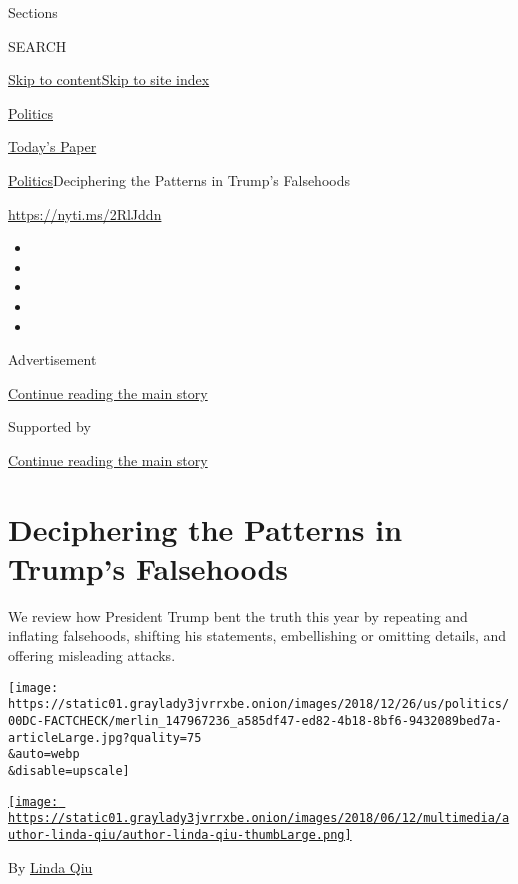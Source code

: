 Sections

SEARCH

\protect\hyperlink{site-content}{Skip to
content}\protect\hyperlink{site-index}{Skip to site index}

\href{https://www.nytimes3xbfgragh.onion/section/politics}{Politics}

\href{https://myaccount.nytimes3xbfgragh.onion/auth/login?response_type=cookie\&client_id=vi}{}

\href{https://www.nytimes3xbfgragh.onion/section/todayspaper}{Today's
Paper}

\href{/section/politics}{Politics}\textbar{}Deciphering the Patterns in
Trump's Falsehoods

\url{https://nyti.ms/2RlJddn}

\begin{itemize}
\item
\item
\item
\item
\item
\end{itemize}

Advertisement

\protect\hyperlink{after-top}{Continue reading the main story}

Supported by

\protect\hyperlink{after-sponsor}{Continue reading the main story}

\hypertarget{deciphering-the-patterns-in-trumps-falsehoods}{%
\section{Deciphering the Patterns in Trump's
Falsehoods}\label{deciphering-the-patterns-in-trumps-falsehoods}}

We review how President Trump bent the truth this year by repeating and
inflating falsehoods, shifting his statements, embellishing or omitting
details, and offering misleading attacks.

\texttt{[image: https://static01.graylady3jvrrxbe.onion/images/2018/12/26/us/politics/00DC-FACTCHECK/merlin\_147967236\_a585df47-ed82-4b18-8bf6-9432089bed7a-articleLarge.jpg?quality=75\\\&auto=webp\\\&disable=upscale]}

\href{https://www.nytimes3xbfgragh.onion/by/linda-qiu}{\texttt{[image: https://static01.graylady3jvrrxbe.onion/images/2018/06/12/multimedia/author-linda-qiu/author-linda-qiu-thumbLarge.png]}}

By \href{https://www.nytimes3xbfgragh.onion/by/linda-qiu}{Linda Qiu}

